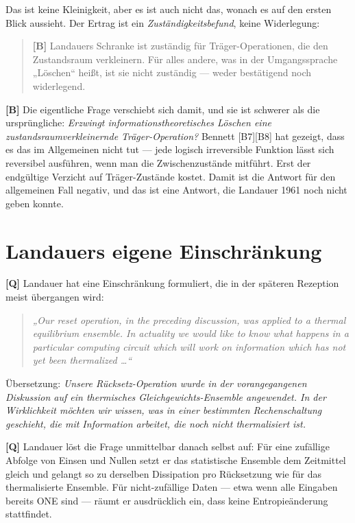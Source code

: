 Das ist keine Kleinigkeit, aber es ist auch nicht das, wonach es auf den ersten
Blick aussieht. Der Ertrag ist ein \emph{Zuständigkeitsbefund}, keine Widerlegung:

\begin{quote}
\textbf{[B]} Landauers Schranke ist zuständig für Träger-Operationen, die den
Zustandsraum verkleinern. Für alles andere, was in der Umgangssprache „Löschen“
heißt, ist sie nicht zuständig --- weder bestätigend noch widerlegend.
\end{quote}

\textbf{[B]} Die eigentliche Frage verschiebt sich damit, und sie ist schwerer als die
ursprüngliche: \emph{Erzwingt informationstheoretisches Löschen eine
zustandsraumverkleinernde Träger-Operation?} Bennett [B7][B8] hat gezeigt, dass es
das im Allgemeinen nicht tut --- jede logisch irreversible Funktion lässt sich
reversibel ausführen, wenn man die Zwischenzustände mitführt. Erst der endgültige
Verzicht auf Träger-Zustände kostet. Damit ist die Antwort für den allgemeinen
Fall negativ, und das ist eine Antwort, die Landauer 1961 noch nicht geben konnte.

\section{Landauers eigene Einschränkung}

\textbf{[Q]} Landauer hat eine Einschränkung formuliert, die in der späteren Rezeption
meist übergangen wird:

\begin{quote}
\itshape
„Our reset operation, in the preceding discussion, was applied to a thermal
equilibrium ensemble. In actuality we would like to know what happens in a
particular computing circuit which will work on information which has not yet been
thermalized \ldots“ \upshape [B1]
\end{quote}

Übersetzung: \emph{Unsere Rücksetz-Operation wurde in der vorangegangenen
Diskussion auf ein thermisches Gleichgewichts-Ensemble angewendet. In der
Wirklichkeit möchten wir wissen, was in einer bestimmten Rechenschaltung
geschieht, die mit Information arbeitet, die noch nicht thermalisiert ist.}

\textbf{[Q]} Landauer löst die Frage unmittelbar danach selbst auf: Für eine zufällige
Abfolge von Einsen und Nullen setzt er das statistische Ensemble dem Zeitmittel
gleich und gelangt so zu derselben Dissipation pro Rücksetzung wie für das
thermalisierte Ensemble. Für nicht-zufällige Daten --- etwa wenn alle Eingaben
bereits \textup{ONE} sind --- räumt er ausdrücklich ein, dass keine
Entropieänderung stattfindet.


